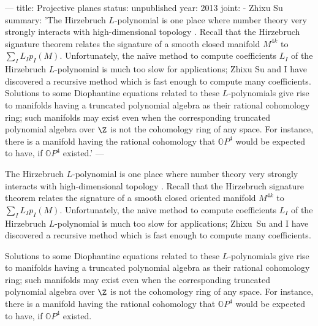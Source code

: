 ---
title: Projective planes
status: unpublished
year: 2013
joint:
  - Zhixu Su
summary: 'The Hirzebruch $L$-polynomial is one place where number theory very strongly interacts with high-dimensional topology \cite{MR0339202}. Recall that the Hirzebruch signature theorem relates the signature of a smooth closed manifold $M^{4k}$ to $\sum_I L_I p_I(M)$. Unfortunately, the na\"ive method to compute coefficients $L_I$ of the Hirzebruch $L$-polynomial is much too slow for applications; Zhixu Su and I have discovered a recursive method which is fast enough to compute many coefficients. Solutions to some Diophantine equations related to these $L$-polynomials give rise to manifolds having a truncated polynomial algebra as their rational cohomology ring; such manifolds may exist even when the corresponding truncated polynomial algebra over $\Z$ is not the cohomology ring of any space.  For instance, there is a manifold having the rational cohomology that $\mathbb{O}P^4$ would be expected to have, if $\mathbb{O}P^4$ existed.'
---


The Hirzebruch $L$-polynomial is one place where number theory very strongly interacts with high-dimensional topology \cite{MR0339202}. Recall that the Hirzebruch signature theorem relates the signature of a smooth closed oriented manifold $M^{4k}$ to $\sum_I L_I p_I(M)$. Unfortunately, the na\"ive method to compute coefficients $L_I$ of the Hirzebruch $L$-polynomial is much too slow for applications; Zhixu~Su and I have discovered a recursive method which is fast enough to compute many coefficients.

  Solutions to some Diophantine equations related to these $L$-polynomials give rise to manifolds having a truncated polynomial algebra as their rational cohomology ring; such manifolds may exist even when the corresponding truncated polynomial algebra over $\Z$ is not the cohomology ring of any space.  For instance, there is a manifold having the rational cohomology that $\mathbb{O}P^4$ would be expected to have, if $\mathbb{O}P^4$ existed.

